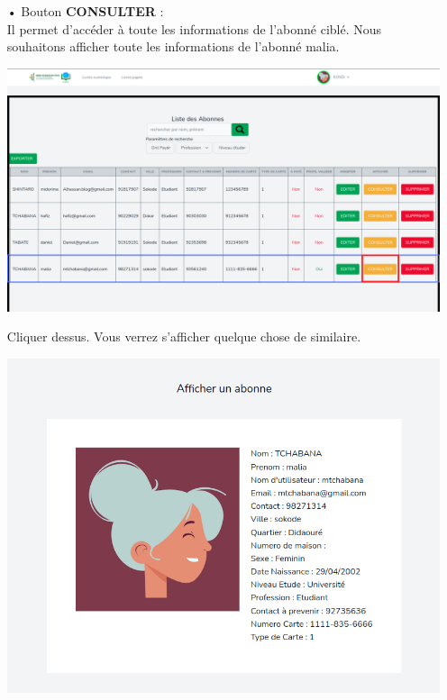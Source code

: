 \documentclass[12pt,a4paper]{article}
\begin{document}
\begin{itemize}
\item[•] Bouton \textbf{CONSULTER} : \\
Il permet d'accéder à toute les informations de l'abonné ciblé. Nous souhaitons afficher toute les informations 
de l'abonné malia.
\begin{center}
\includegraphics[scale=0.33]{img/abonne_show_btn.png}
\end{center}
Cliquer dessus. Vous verrez s'afficher quelque chose de similaire.
\begin{center}
\includegraphics[scale=0.5]{img/abonne_show.png}
\end{center}


\end{itemize}
\end{document}
